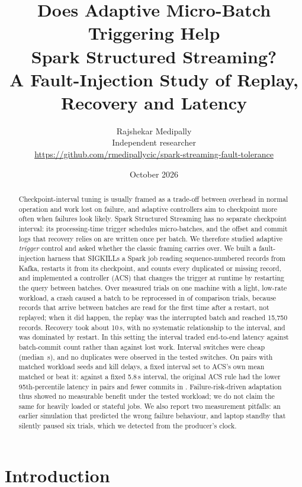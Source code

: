 \documentclass[10pt,twocolumn]{article}
\title{Does Adaptive Micro-Batch Triggering Help\\ Spark Structured Streaming?\\
\large A Fault-Injection Study of Replay, Recovery and Latency}
\author{Rajshekar Medipally\\
\small Independent researcher\\
\small \url{https://github.com/rmedipallycic/spark-streaming-fault-tolerance}}
\date{October 2026}
\begin{document}
\maketitle
\thispagestyle{fancy}

\begin{abstract}
Checkpoint-interval tuning is usually framed as a trade-off between overhead
in normal operation and work lost on failure, and adaptive controllers aim to
checkpoint more often when failures look likely. Spark Structured Streaming has
no separate checkpoint interval: its processing-time trigger schedules
micro-batches, and the offset and commit logs that recovery relies on are
written once per batch. We therefore studied adaptive \emph{trigger} control
and asked whether the classic framing carries over. We built a fault-injection
harness that SIGKILLs a Spark job reading sequence-numbered records from Kafka,
restarts it from its checkpoint, and counts every duplicated or missing record,
and implemented a controller (ACS) that changes the trigger at runtime by
restarting the query between batches. Over \AllTrials{} measured trials on one
machine with a light, low-rate workload, a crash caused a batch to be
reprocessed in \ReplayEvents{} of \CleanTrials{} comparison trials, because
records that arrive between batches are read for the first time after a
restart, not replayed; when it did happen, the replay was the interrupted batch
and reached 15{,}750 records. Recovery took about 10\,s, with no systematic
relationship to the interval, and was dominated by restart. In this setting the interval traded end-to-end
latency against batch-commit count rather than against lost work. Interval
switches were cheap (median \SwitchMed\,s), and no duplicates were observed in
the \Switches{} tested switches. On pairs with matched workload seeds and kill delays, a
fixed interval set to ACS's own mean matched or beat it: against a fixed
5.8\,s interval, the original ACS rule had the lower 95th-percentile latency in
\PairPninetyfiveAcsOneTwo{} pairs and fewer commits in \PairCommitsAcsOneTwo.
Failure-risk-driven adaptation thus showed no measurable benefit under the
tested workload; we do not claim the same for heavily loaded or stateful jobs.
We also report two measurement pitfalls: an earlier simulation that predicted
the wrong failure behaviour, and laptop standby that silently paused six
trials, which we detected from the producer's clock.
\end{abstract}

\section{Introduction}
\end{document}

